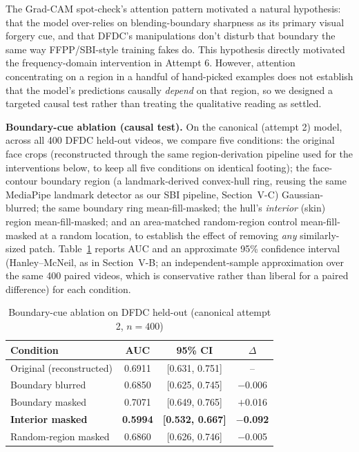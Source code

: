 \documentclass[conference]{IEEEtran}
\begin{document}
The Grad-CAM spot-check's attention pattern motivated a natural hypothesis:
that the model over-relies on blending-boundary sharpness as its primary
visual forgery cue, and that DFDC's manipulations don't disturb that
boundary the same way FFPP/SBI-style training fakes do. This hypothesis
directly motivated the frequency-domain intervention in Attempt 6. However,
attention concentrating on a region in a handful of hand-picked examples
does not establish that the model's predictions causally \emph{depend} on
that region, so we designed a targeted causal test rather than treating the
qualitative reading as settled.

\textbf{Boundary-cue ablation (causal test).} On the canonical (attempt 2)
model, across all 400 DFDC held-out videos, we compare five conditions:
the original face crops (reconstructed through the same region-derivation
pipeline used for the interventions below, to keep all five conditions on
identical footing); the face-contour boundary region (a landmark-derived
convex-hull ring, reusing the same MediaPipe landmark detector as our SBI
pipeline, Section~V-C) Gaussian-blurred; the same boundary ring
mean-fill-masked; the hull's \emph{interior} (skin) region mean-fill-masked;
and an area-matched random-region control mean-fill-masked at a random
location, to establish the effect of removing \emph{any} similarly-sized
patch. Table~\ref{tab:boundary-ablation} reports AUC and an approximate
95\% confidence interval (Hanley--McNeil, as in Section~V-B; an independent-sample
approximation over the same 400 paired videos, which is conservative rather
than liberal for a paired difference) for each condition.

\begin{table}[t]
\caption{Boundary-cue ablation on DFDC held-out (canonical attempt 2, $n=400$)}
\label{tab:boundary-ablation}
\centering
\begin{tabular}{@{}lccc@{}}
\toprule
Condition & AUC & 95\% CI & $\Delta$ \\
\midrule
Original (reconstructed) & 0.6911 & [0.631, 0.751] & -- \\
Boundary blurred & 0.6850 & [0.625, 0.745] & $-$0.006 \\
Boundary masked & 0.7071 & [0.649, 0.765] & $+$0.016 \\
\textbf{Interior masked} & \textbf{0.5994} & \textbf{[0.532, 0.667]} & \textbf{$-$0.092} \\
Random-region masked & 0.6860 & [0.626, 0.746] & $-$0.005 \\
\bottomrule
\end{tabular}
\end{table}
\end{document}
